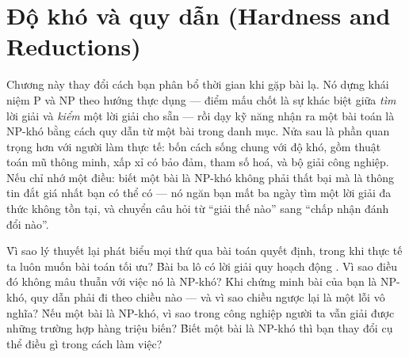 \documentclass[../../algorithm.tex]{subfiles}
\begin{document}
\chapter{Độ khó và quy dẫn (Hardness and Reductions)}

\begin{tomtat}
Chương này thay đổi cách bạn phân bổ thời gian khi gặp bài lạ. Nó dựng khái niệm P và NP theo hướng thực dụng --- điểm mấu chốt là sự khác biệt giữa \emph{tìm} lời giải và \emph{kiểm} một lời giải cho sẵn --- rồi dạy kỹ năng nhận ra một bài toán là NP-khó bằng cách quy dẫn từ một bài trong danh mục. Nửa sau là phần quan trọng hơn với người làm thực tế: bốn cách sống chung với độ khó, gồm thuật toán mũ thông minh, xấp xỉ có bảo đảm, tham số hoá, và bộ giải công nghiệp. Nếu chỉ nhớ một điều: biết một bài là NP-khó không phải thất bại mà là thông tin đắt giá nhất bạn có thể có --- nó ngăn bạn mất ba ngày tìm một lời giải đa thức không tồn tại, và chuyển câu hỏi từ ``giải thế nào'' sang ``chấp nhận đánh đổi nào''.
\end{tomtat}

\begin{nentang}
\end{nentang}

\begin{khoigoi}
\h{Vì sao lý thuyết lại phát biểu mọi thứ qua bài toán quyết định, trong khi thực tế ta luôn muốn bài toán tối ưu?}
\h{Bài ba lô có lời giải quy hoạch động . Vì sao điều đó không mâu thuẫn với việc nó là NP-khó?}
\h{Khi chứng minh bài của bạn là NP-khó, quy dẫn phải đi theo chiều nào --- và vì sao chiều ngược lại là một lỗi vô nghĩa?}
\h{Nếu một bài là NP-khó, vì sao trong công nghiệp người ta vẫn giải được những trường hợp hàng triệu biến?}
\h{Biết một bài là NP-khó thì bạn thay đổi cụ thể điều gì trong cách làm việc?}
\end{khoigoi}
\end{document}

